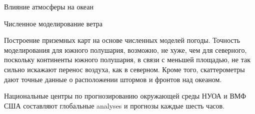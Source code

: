 \begin{chapter}{Влияние атмосферы на океан}
\begin{section}{Численное моделирование ветра}
\begin{paragraph}{Построение приземных карт на основе численных моделей погоды.}
Точность моделирования для южного полушария, возможно, не хуже, чем 
для северного, поскольку континенты южного полушария, в связи с меньшей 
площадью, не так сильно искажают перенос воздуха, как в северном. Кроме
того, скаттерометры дают точные данные о расположении штормов и
фронтов над океаном.
%

Национальные центры по прогнозированию окружающей среды НУОА и ВМФ США
составляют глобальные analyses и прогнозы каждые шесть часов.
%
%
\end{paragraph}


\end{section}
\end{chapter}
